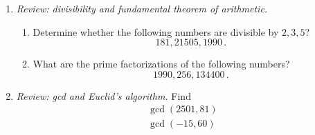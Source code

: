 \documentclass[12pt]{amsart}
\begin{document}
\begin{enumerate}[label=\arabic*.,itemsep=10pt, leftmargin=*]
\item
    \textit{Review: divisibility and fundamental theorem of arithmetic.}
    \begin{enumerate}
        \item Determine whether the following numbers are divisible by $2,3,5$?
        \begin{equation*}
            181, 21505, 1990 \,.
        \end{equation*}
        
        \item What are the prime factorizations of the following numbers?
        \begin{equation*}
            1990, 256, 134400 \,.
        \end{equation*}
        
    \end{enumerate}
    
    
    

\item
    \textit{Review: gcd and Euclid's algorithm.}
    Find 
    \begin{gather*}
        \gcd(2501, 81)\\
        \gcd(-15, 60)
    \end{gather*}
    
    


\end{enumerate}
\end{document}
